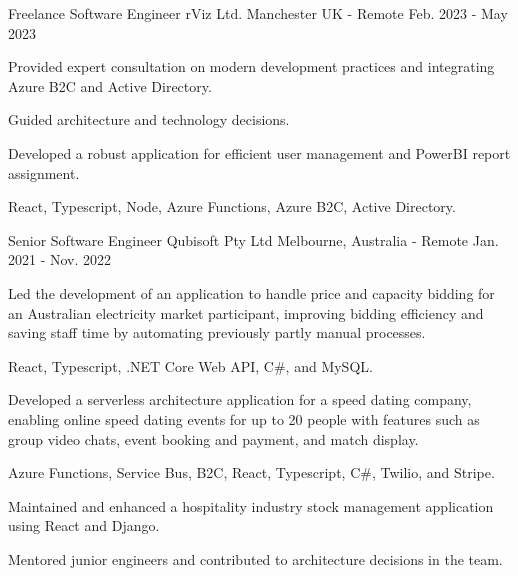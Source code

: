 

\begin{cventries}

\cventry
{Freelance Software Engineer} %
{rViz Ltd.} %
{Manchester UK - Remote} %
{Feb. 2023 - May 2023} %
{
  \begin{cvitems} %
    \item {Provided expert consultation on modern development practices and integrating Azure B2C and Active Directory.}
    \item {Guided architecture and technology decisions.}
    \item {Developed a robust application for efficient user management and PowerBI report assignment.}
    \item {React, Typescript, Node, Azure Functions, Azure B2C, Active Directory.}
  \end{cvitems}
}

\cventry
{Senior Software Engineer} %
{Qubisoft Pty Ltd} %
{Melbourne, Australia - Remote} %
{Jan. 2021 - Nov. 2022} %
{
  \begin{cvitems} %
    \item {Led the development of an application to handle price and capacity bidding for an Australian electricity market participant, improving bidding efficiency and saving staff time by automating previously partly manual processes.} 
    \item {React, Typescript, .NET Core Web API, C\#, and MySQL.}
    \item {Developed a serverless architecture application for a speed dating company, enabling online speed dating events for up to 20 people with features such as group video chats, event booking and payment, and match display.}
    \item {Azure Functions, Service Bus, B2C, React, Typescript, C\#, Twilio, and Stripe.}
    \item {Maintained and enhanced a hospitality industry stock management application using React and Django.}
    \item {Mentored junior engineers and contributed to architecture decisions in the team.}
  \end{cvitems}
}


\end{cventries}
